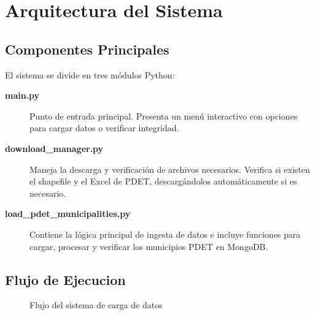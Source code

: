\documentclass[12pt,a4paper]{article}
\begin{document}
\section{Arquitectura del Sistema}

\subsection{Componentes Principales}

El sistema se divide en tres módulos Python:

\begin{description}
  \item[\textbf{main.py}] Punto de entrada principal. Presenta un menú interactivo con opciones para cargar datos o verificar integridad.
  \item[\textbf{download\_manager.py}] Maneja la descarga y verificación de archivos necesarios. Verifica si existen el shapefile y el Excel de PDET, descargándolos automáticamente si es necesario.
  \item[\textbf{load\_pdet\_municipalities.py}] Contiene la lógica principal de ingesta de datos e incluye funciones para cargar, procesar y verificar los municipios PDET en MongoDB.
\end{description}

\subsection{Flujo de Ejecucion}

\begin{figure}[H]
  \centering
  \caption{Flujo del sistema de carga de datos}
\end{figure}
\end{document}

